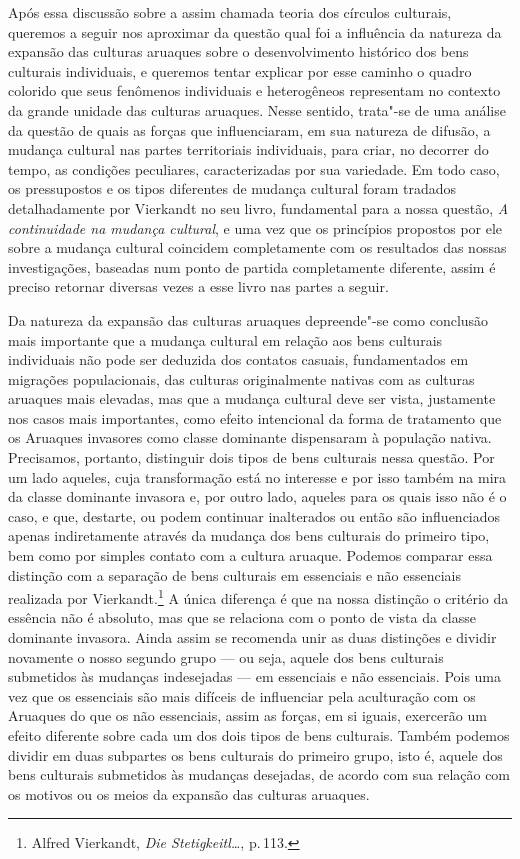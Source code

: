 Após essa discussão sobre a assim chamada teoria dos círculos
culturais, queremos a seguir nos aproximar da questão qual foi a
influência da natureza da expansão das culturas aruaques sobre o
desenvolvimento histórico dos bens culturais individuais, e queremos
tentar explicar por esse caminho o quadro colorido que seus fenômenos
individuais e heterogêneos representam no contexto da grande unidade
das culturas aruaques. Nesse sentido, trata"-se de uma análise da questão
de quais as forças que influenciaram, em sua natureza de difusão, a
mudança cultural nas partes territoriais individuais, para criar, no
decorrer do tempo, as condições peculiares, caracterizadas por sua
variedade. Em todo caso, os pressupostos e os tipos diferentes de
mudança cultural foram tradados detalhadamente por Vierkandt no seu
livro, fundamental para a nossa questão, \textit{A continuidade na mudança cultural}, 
e uma vez que
os princípios propostos por ele sobre a mudança cultural coincidem
completamente com os resultados das nossas investigações, baseadas num
ponto de partida completamente diferente, assim é preciso retornar
diversas vezes a esse livro nas partes a seguir.

Da natureza da expansão das culturas aruaques depreende"-se como
conclusão mais importante que a mudança cultural em relação aos bens
culturais individuais não pode ser deduzida dos contatos casuais,
fundamentados em migrações populacionais, das culturas originalmente
nativas com as culturas aruaques mais elevadas, mas que a mudança
cultural deve ser vista, justamente nos casos mais importantes, como
efeito intencional da forma de tratamento que os Aruaques invasores como
classe dominante dispensaram à população nativa. Precisamos, portanto,
distinguir dois tipos de bens culturais nessa questão. Por um lado
aqueles, cuja transformação está no interesse e por isso também na mira
da classe dominante invasora e, por outro lado, aqueles para os quais
isso não é o caso, e que, destarte, ou podem continuar inalterados ou
então são influenciados apenas indiretamente através da mudança dos bens
culturais do primeiro tipo, bem como por simples contato com a cultura
aruaque. Podemos comparar essa distinção com a separação de bens
culturais em essenciais e não essenciais realizada por
Vierkandt.\footnote{Alfred Vierkandt, \textit{Die Stetigkeitl\ldots}, p.\,113.} A única diferença é que na nossa distinção o
critério da essência não é absoluto, mas que se relaciona com o ponto de
vista da classe dominante invasora. Ainda assim se recomenda unir as
duas distinções e dividir novamente o nosso segundo grupo --- ou seja,
aquele dos bens culturais submetidos às mudanças indesejadas --- em
essenciais e não essenciais. Pois uma vez que os essenciais são mais
difíceis de influenciar pela aculturação com os Aruaques do que os
não essenciais, assim as forças, em si iguais, exercerão um efeito
diferente sobre cada um dos dois tipos de bens culturais. Também podemos
dividir em duas subpartes os bens culturais do primeiro grupo, isto é,
aquele dos bens culturais submetidos às mudanças desejadas, de acordo
com sua relação com os motivos ou os meios da expansão das culturas
aruaques.

